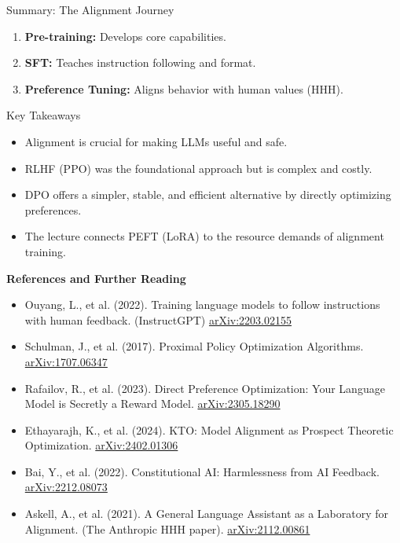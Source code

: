 \documentclass[xcolor=svgnames, 10pt, handout]{beamer}
\begin{document}
\begin{frame}{Summary: The Alignment Journey}
    \begin{enumerate}
        \item \textbf{Pre-training:} Develops core capabilities.
        \pause
        \item \textbf{SFT:} Teaches instruction following and format.
        \pause
        \item \textbf{Preference Tuning:} Aligns behavior with human values (HHH).
    \end{enumerate}

    \pause
    \begin{block}{Key Takeaways}
        \begin{itemize}
            \item Alignment is crucial for making LLMs useful and safe.
            \pause
            \item RLHF (PPO) was the foundational approach but is complex and costly.
            \pause
            \item DPO offers a simpler, stable, and efficient alternative by directly optimizing preferences.
            \pause
            \item The lecture connects PEFT (LoRA) to the resource demands of alignment training.
        \end{itemize}
    \end{block}
    \tiny
\textbf{References and Further Reading}
    \begin{itemize}
        \item Ouyang, L., et al. (2022). Training language models to follow instructions with human feedback. (InstructGPT) \href{https://arxiv.org/abs/2203.02155}{arXiv:2203.02155}

        \item Schulman, J., et al. (2017). Proximal Policy Optimization Algorithms. \href{https://arxiv.org/abs/1707.06347}{arXiv:1707.06347}

        \item Rafailov, R., et al. (2023). Direct Preference Optimization: Your Language Model is Secretly a Reward Model. \href{https://arxiv.org/abs/2305.18290}{arXiv:2305.18290}

        \item Ethayarajh, K., et al. (2024). KTO: Model Alignment as Prospect Theoretic Optimization. \href{https://arxiv.org/abs/2402.01306}{arXiv:2402.01306}

        \item Bai, Y., et al. (2022). Constitutional AI: Harmlessness from AI Feedback. \href{https://arxiv.org/abs/2212.08073}{arXiv:2212.08073}

        \item Askell, A., et al. (2021). A General Language Assistant as a Laboratory for Alignment. (The Anthropic HHH paper). \href{https://arxiv.org/abs/2112.00861}{arXiv:2112.00861}
    \end{itemize}
\end{frame}
\end{document}
